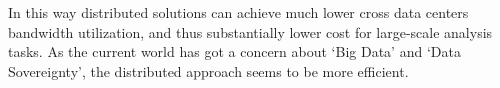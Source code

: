 In this way distributed solutions can achieve much lower cross data centers bandwidth utilization, and thus substantially lower cost for large-scale analysis tasks. As the current world has got a concern about `Big Data' and `Data Sovereignty', the distributed approach seems to be more efficient. 


\endinput